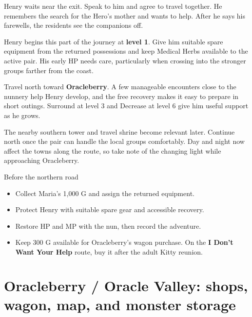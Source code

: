 Henry waits near the exit. Speak to him and agree to travel together.
He remembers the search for the Hero's mother and wants to help.
After he says his farewells, the residents see the companions off.

Henry begins this part of the journey at \textbf{level 1}. Give him
suitable spare equipment from the returned possessions and keep
Medical Herbs available to the active pair. His early HP needs care,
particularly when crossing into the stronger groups farther from the
coast.

Travel north toward \textbf{Oracleberry}. A few manageable encounters
close to the nunnery help Henry develop, and the free recovery makes
it easy to prepare in short outings. Surround at level 3 and Decrease
at level 6 give him useful support as he grows.

The nearby southern tower and travel shrine become relevant later.
Continue north once the pair can handle the local groups comfortably.
Day and night now affect the towns along the route, so take note of
the changing light while approaching Oracleberry.

\begin{routecheck}{Before the northern road}
\begin{itemize}
  \item Collect Maria's 1,000 G and assign the returned equipment.
  \item Protect Henry with suitable spare gear and accessible recovery.
  \item Restore HP and MP with the nun, then record the adventure.
  \item Keep 300 G available for Oracleberry's wagon purchase. On the
    \textbf{I Don't Want Your Help} route, buy it after the adult Kitty reunion.
\end{itemize}
\end{routecheck}

\section{Oracleberry / Oracle Valley: shops, wagon, map, and monster storage}



